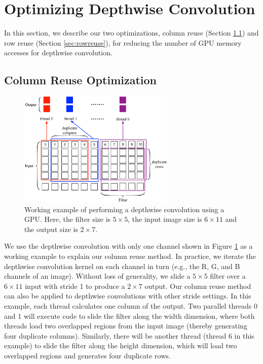 \section{Optimizing Depthwise Convolution}
\label{sec:strategies} In this section, we describe our two optimizations, column reuse (Section \ref{sec:creuse}) and row reuse (Section
\ref{sec:rowreuse}), for reducing the number of GPU memory accesses for depthwise convolution.
\subsection{Column Reuse Optimization}
\label{sec:creuse}


\begin{figure}[t!]
\centering
  \includegraphics[width=0.9\columnwidth,height=5.5cm]{./figure/twostrategies.eps}
  \caption{Working example of performing a depthwise convolution using a GPU. Here, the filter size is $5 \times 5$, the input image size is $6 \times 11$
  and the output size is $2 \times 7$.}
  \label{fig:twostrategies}
\end{figure}


 We use the depthwise convolution with only one channel shown in Figure \ref{fig:twostrategies} as a working
example to explain our column reuse method. In practice, we iterate the depthwise convolution kernel on each channel in turn (e.g., the R,
G, and B channels of an image). Without loss of generality, we slide a $5 \times 5$ filter over a $6 \times 11$ input with stride 1 to
produce a $2 \times 7$ output. Our column reuse method can also be applied to depthwise convolutions with other stride settings. In this
example, each thread calculates one column of the output. Two parallel threads 0 and 1 will execute code to slide the filter along the
width dimension, where both threads load two overlapped regions from the input image (thereby generating four duplicate columns).
Similarly, there will be another thread (thread 6 in this example) to slide the filter along the height dimension, which will load two
overlapped regions and generates four duplicate rows.


